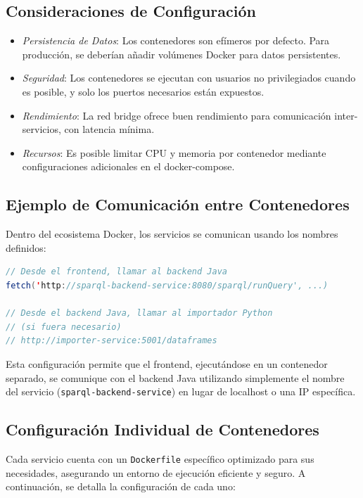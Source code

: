 \documentclass{article}
\begin{document}
\subsection{Consideraciones de Configuración}
\begin{itemize}
    \item \textit{Persistencia de Datos}: Los contenedores son efímeros por defecto. Para producción, se deberían añadir volúmenes Docker para datos persistentes.

    \item \textit{Seguridad}: Los contenedores se ejecutan con usuarios no privilegiados cuando es posible, y solo los puertos necesarios están expuestos.

    \item \textit{Rendimiento}: La red bridge ofrece buen rendimiento para comunicación inter-servicios, con latencia mínima.

    \item \textit{Recursos}: Es posible limitar CPU y memoria por contenedor mediante configuraciones adicionales en el docker-compose.
\end{itemize}

\subsection{Ejemplo de Comunicación entre Contenedores}
Dentro del ecosistema Docker, los servicios se comunican usando los nombres definidos:

\begin{lstlisting}[language=java, basicstyle=\small\ttfamily]
// Desde el frontend, llamar al backend Java
fetch('http://sparql-backend-service:8080/sparql/runQuery', ...)

// Desde el backend Java, llamar al importador Python
// (si fuera necesario)
// http://importer-service:5001/dataframes
\end{lstlisting}

Esta configuración permite que el frontend, ejecutándose en un contenedor separado, se comunique con el backend Java utilizando simplemente el nombre del servicio (\texttt{sparql-backend-service}) en lugar de localhost o una IP específica.

\subsection{Configuración Individual de Contenedores}

Cada servicio cuenta con un \texttt{Dockerfile} específico optimizado para sus necesidades, asegurando un entorno de ejecución eficiente y seguro. A continuación, se detalla la configuración de cada uno:
\end{document}
